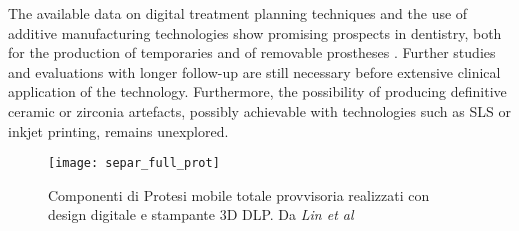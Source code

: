 The available data on digital treatment planning techniques and the use of additive manufacturing technologies show promising prospects in dentistry, both for the production of temporaries \parencite{Reference125} and of removable prostheses \parencite{Reference107}. Further studies and evaluations with longer follow-up are still necessary before extensive clinical application of the technology. Furthermore, the possibility of producing definitive ceramic or zirconia artefacts, possibly achievable with technologies such as SLS or inkjet printing, remains unexplored.
\begin{figure}[h]
\vspace{-10pt}
	\begin{center}
	\texttt{[image: separ\_full\_prot]}
    \caption{Componenti di Protesi mobile totale provvisoria realizzati con design digitale e stampante 3D DLP. Da \emph{Lin et al} \parencite{Reference108}}
    \label{fig:separ_full_prot}
    \end{center}
\vspace{-30pt}
\end{figure}

